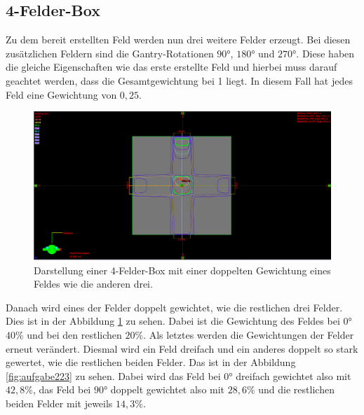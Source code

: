 \subsection{4-Felder-Box}
\label{subsec:Box}

Zu dem bereit erstellten Feld werden nun drei weitere Felder erzeugt. Bei diesen
zusätzlichen Feldern sind die Gantry-Rotationen $90°$, $180°$ und $270°$. Diese haben die gleiche Eigenschaften wie das erste erstellte Feld und hierbei muss darauf geachtet werden, dass die Gesamtgewichtung bei 1 liegt. In diesem Fall hat jedes Feld eine Gewichtung von $0,25$.

\begin{figure}[H]
	\centering
	\includegraphics[width=0.7\linewidth]{../../Wasserphantom Bilder/Aufgabe222.png}
	\caption{Darstellung einer 4-Felder-Box mit einer doppelten Gewichtung eines Feldes wie die anderen drei.}
	\label{fig:aufgabe222}
\end{figure}

Danach wird eines der Felder doppelt gewichtet, wie die restlichen drei Felder. Dies ist in der Abbildung \ref{fig:aufgabe222} zu sehen. Dabei ist die Gewichtung des Feldes bei
$0°$ $40\%$ und bei den restlichen $20\%$.
Als letztes werden die Gewichtungen der Felder erneut verändert. Diesmal wird ein Feld dreifach und ein anderes doppelt so stark gewertet, wie die restlichen beiden Felder. Das ist in der Abbildung \ref{fig:aufgabe223} zu sehen. Dabei wird das Feld bei $0°$ dreifach
gewichtet also mit $42,8\%$, das Feld bei $90°$ doppelt gewichtet also mit $28,6\%$ und
die restlichen beiden Felder mit jeweils $14,3\%$.

